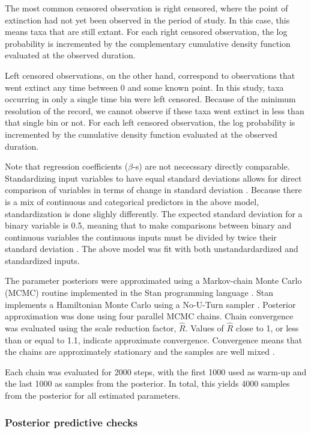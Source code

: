 \documentclass[12pt,letterpaper]{article}
\begin{document}
The most common censored observation is right censored, where the point of extinction had not yet been observed in the period of study. In this case, this means taxa that are still extant. For each right censored observation, the log probability is incremented by the complementary cumulative density function evaluated at the observed duration.

Left censored observations, on the other hand, correspond to observations that went extinct any time between 0 and some known point. In this study, taxa occurring in only a single time bin were left censored. Because of the minimum resolution of the record, we cannot observe if these taxa went extinct in less than that single bin or not. For each left censored observation, the log probability is incremented by the cumulative density function evaluated at the observed duration.

Note that regression coefficients (\(\beta\)-s) are not nececssary directly comparable. Standardizing input variables to have equal standard deviations allows for direct comparison of variables in terms of change in standard deviation \citep{Schielzeth2010}. Because there is a mix of continuous and categorical predictors in the above model, standardization is done slighly differently. The expected standard deviation for a binary variable is 0.5, meaning that to make comparisons between binary and continuous variables the continuous inputs must be divided by twice their standard deviation \citep{Gelman2008}. The above model was fit with both unstandardardized and standardized inputs.

The parameter posteriors were approximated using a Markov-chain Monte Carlo (MCMC) routine implemented in the Stan programming language \citep{2014stan}. Stan implements a Hamiltonian Monte Carlo using a No-U-Turn sampler \citep{Hoffman-Gelman:2011}. Posterior approximation was done using four parallel MCMC chains. Chain convergence was evaluated using the scale reduction factor, \(\hat{R}\). Values of \(\hat{R}\) close to 1, or less than or equal to 1.1, indicate approximate convergence. Convergence means that the chains are approximately stationary and the samples are well mixed \citep{Gelman2013d}.

Each chain was evaluated for 2000 steps, with the first 1000 used as warm-up and the last 1000 as samples from the posterior. In total, this yields 4000 samples from the posterior for all estimated parameters. 


\subsubsection{Posterior predictive checks}
\end{document}

